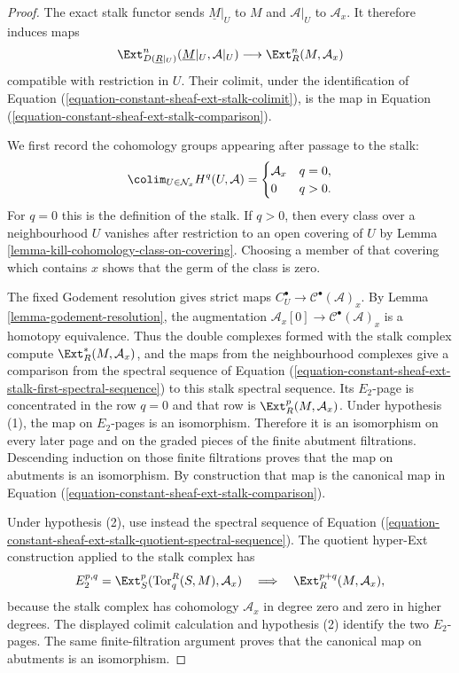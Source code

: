 \begin{proof}
The exact stalk functor sends $\underline{M}|_U$ to $M$ and
$\mathcal{A}|_U$ to $\mathcal{A}_x$. It therefore induces maps
$$
\Ext^n_{D(\underline{R}|_U)}
(\underline{M}|_U, \mathcal{A}|_U)
\longrightarrow \Ext_R^n(M, \mathcal{A}_x)
$$
compatible with restriction in $U$. Their colimit, under the identification
of Equation (\ref{equation-constant-sheaf-ext-stalk-colimit}), is the map
in Equation (\ref{equation-constant-sheaf-ext-stalk-comparison}).

We first record the cohomology groups appearing after passage to the stalk:
$$
\colim_{U \in \mathcal{N}_x} H^q(U, \mathcal{A}) =
\begin{cases}
\mathcal{A}_x & q = 0, \\
0 & q > 0.
\end{cases}
$$
For $q = 0$ this is the definition of the stalk. If $q > 0$, then every
class over a neighbourhood $U$ vanishes after restriction to an open
covering of $U$ by
Lemma \ref{lemma-kill-cohomology-class-on-covering}. Choosing a member of
that covering which contains $x$ shows that the germ of the class is zero.

The fixed Godement resolution gives strict maps
$C_U^\bullet \to \mathcal{C}^\bullet(\mathcal{A})_x$. By
Lemma \ref{lemma-godement-resolution}, the augmentation
$\mathcal{A}_x[0] \to \mathcal{C}^\bullet(\mathcal{A})_x$ is a homotopy
equivalence. Thus the double complexes formed with the stalk complex compute
$\Ext_R^*(M, \mathcal{A}_x)$, and the maps from the neighbourhood complexes
give a comparison from the spectral sequence of Equation
(\ref{equation-constant-sheaf-ext-stalk-first-spectral-sequence}) to this
stalk spectral sequence. Its $E_2$-page is concentrated in the row $q = 0$
and that row is $\Ext_R^p(M, \mathcal{A}_x)$. Under hypothesis (1), the map
on $E_2$-pages is an isomorphism. Therefore it is an isomorphism on every
later page and on the graded pieces of the finite abutment filtrations.
Descending induction on those finite filtrations proves that the map on
abutments is an isomorphism. By construction that map is the canonical map
in Equation (\ref{equation-constant-sheaf-ext-stalk-comparison}).

Under hypothesis (2), use instead the spectral sequence of Equation
(\ref{equation-constant-sheaf-ext-stalk-quotient-spectral-sequence}). The
quotient hyper-Ext construction applied to the stalk complex has
$$
E_2^{p, q} =
\Ext_S^p(\text{Tor}_q^R(S, M), \mathcal{A}_x)
\quad\Longrightarrow\quad
\Ext_R^{p + q}(M, \mathcal{A}_x),
$$
because the stalk complex has cohomology $\mathcal{A}_x$ in degree zero and
zero in higher degrees. The displayed colimit calculation and hypothesis
(2) identify the two $E_2$-pages.
The same finite-filtration argument proves that the canonical map on
abutments is an isomorphism.
\end{proof}


